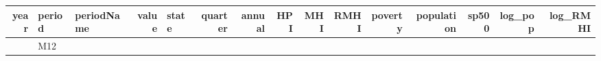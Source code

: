 \documentclass[
]{article}
\begin{document}
\begin{longtable}[]{@{}rllrlrrrrrrrrrr@{}}
\begin{minipage}[b]{0.03\columnwidth}
year\strut
\end{minipage} & \begin{minipage}[b]{0.04\columnwidth}\raggedright
period\strut
\end{minipage} & \begin{minipage}[b]{0.06\columnwidth}\raggedright
periodName\strut
\end{minipage} & \begin{minipage}[b]{0.03\columnwidth}\raggedleft
value\strut
\end{minipage} & \begin{minipage}[b]{0.03\columnwidth}\raggedright
state\strut
\end{minipage} & \begin{minipage}[b]{0.05\columnwidth}\raggedleft
quarter\strut
\end{minipage} & \begin{minipage}[b]{0.04\columnwidth}\raggedleft
annual\strut
\end{minipage} & \begin{minipage}[b]{0.04\columnwidth}\raggedleft
HPI\strut
\end{minipage} & \begin{minipage}[b]{0.03\columnwidth}\raggedleft
MHI\strut
\end{minipage} & \begin{minipage}[b]{0.03\columnwidth}\raggedleft
RMHI\strut
\end{minipage} & \begin{minipage}[b]{0.05\columnwidth}\raggedleft
poverty\strut
\end{minipage} & \begin{minipage}[b]{0.06\columnwidth}\raggedleft
population\strut
\end{minipage} & \begin{minipage}[b]{0.03\columnwidth}\raggedleft
sp500\strut
\end{minipage} & \begin{minipage}[b]{0.05\columnwidth}\raggedleft
log\_pop\strut
\end{minipage} & \begin{minipage}[b]{0.05\columnwidth}\raggedleft
log\_RMHI\strut
\end{minipage}\tabularnewline
\midrule
\endhead
\begin{minipage}[t]{0.03\columnwidth}\raggedleft
1984\strut
\end{minipage} & \begin{minipage}[t]{0.04\columnwidth}\raggedright
M12\strut
\end{minipage} & \begin{minipage}[t]{0.06\columnwidth}\raggedright

\end{minipage}
\end{longtable}
\end{document}
